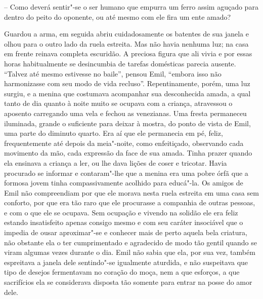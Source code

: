 -- Como deverá sentir"-se o ser humano que empurra um ferro assim
aguçado para dentro do peito do oponente, ou até mesmo com ele fira 
um ente amado?

Guardou a arma, em seguida abriu cuidadosamente os batentes de sua
janela e olhou para o outro lado da ruela estreita. Mas não havia
nenhuma luz; na casa em frente reinava completa escuridão. A preciosa
figura que ali vivia e por essas horas habitualmente se desincumbia de
tarefas domésticas parecia ausente. ``Talvez até mesmo estivesse no
baile'', pensou Emil, ``embora isso não harmonizasse com seu modo de vida
recluso''. Repentinamente, porém, uma luz surgiu, e a menina que
costumava acompanhar sua desconhecida amada, a qual tanto de dia quanto
à noite muito se ocupava com a criança, atravessou o aposento
carregando uma vela e fechou as venezianas. Uma fresta permaneceu
iluminada, grande o suficiente para deixar à mostra, do ponto de vista
de Emil, uma parte do diminuto quarto. Era aí que ele permanecia em pé,
feliz, frequentemente até depois da meia"-noite, como enfeitiçado,
observando cada movimento da mão, cada expressão da face de sua amada.
Tinha prazer quando ela ensinava a criança a ler, ou lhe dava lições de
coser e tricotar. Havia procurado se informar e contaram"-lhe que a
menina era uma pobre órfã que a formosa jovem tinha compassivamente
acolhido para educá"-la. Os amigos de Emil não compreendiam por que ele
morava nesta ruela estreita em uma casa sem conforto, por que era tão
raro que ele procurasse a companhia de outras pessoas, e com o que ele
se ocupava. Sem ocupação e vivendo na solidão ele era feliz 
estando insatisfeito apenas consigo mesmo e com seu caráter insociável
que o impedia de ousar aproximar"-se e conhecer mais de perto aquela
bela criatura, não obstante ela o ter cumprimentado e agradecido de
modo tão gentil quando se viram algumas vezes durante o dia. Emil não
sabia que ela, por sua vez, também espreitava a janela dele sentindo"-se
igualmente aturdida, e não suspeitava que tipo de desejos fermentavam 
no coração do moça, nem a que esforços, a que sacrifícios
ela se considerava disposta tão somente para entrar na posse do amor dele. 


